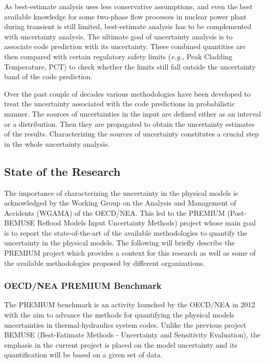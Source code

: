\documentclass[11pt,titlepage]{article}
\begin{document}
As best-estimate analysis uses less conservative assumptions, and even the best available knowledge for some two-phase flow processes in nuclear power plant during transient is still limited, best-estimate analysis has to be complemented with uncertainty analysis.
The ultimate goal of uncertainty analysis is to associate code prediction with its uncertainty. 
These combined quantities are then compared with certain regulatory safety limits (\textit{e.g.,} Peak Cladding Temperature, PCT) to check whether the limits still fall outside the uncertainty band of the code prediction.

Over the past couple of decades various methodologies have been developed to treat the uncertainty associated with the code predictions in probabilistic manner.
The sources of uncertainties in the input are defined either as an interval or a distribution. 
Then they are propagated to obtain the uncertainty estimates of the results. 
Characterizing the sources of uncertainty constitutes a crucial step in the whole uncertainty analysis.

\subsection{State of the Research}

The importance of characterizing the uncertainty in the physical models is acknowledged by the Working Group on the Analysis and Management of Accidents (WGAMA) of the OECD/NEA. 
This led to the PREMIUM (Post-BEMUSE Reflood Models Input Uncertainty Methods) project whose main goal is to report the state-of-the-art of the available methodologies to quantify the uncertainty in the physical models. 
The following will briefly describe the PREMIUM project which provides a context for this research as well as some of the available methodologies proposed by different organizations.

\subsubsection{OECD/NEA PREMIUM Benchmark}

The PREMIUM benchmark is an activity launched by the OECD/NEA in 2012 with the aim to advance the methods for quantifying the physical models uncertainties in thermal-hydraulics system codes. 
Unlike the previous project BEMUSE (Best-Estimate Methods - Uncertainty and Sensitivity Evaluation), 
the emphasis in the current project is placed on the model uncertainty and its quantification will be based on a given set of data.
\end{document}
